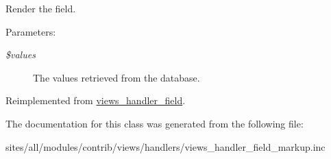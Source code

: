Render the field.

\begin{Desc}
\item[Parameters:]
\begin{description}
\item[{\em \$values}]The values retrieved from the database. \end{description}
\end{Desc}


Reimplemented from \hyperlink{classviews__handler__field_82ff951c5e9ceb97b2eab86f880cbc1e}{views\_\-handler\_\-field}.

The documentation for this class was generated from the following file:\begin{CompactItemize}
\item 
sites/all/modules/contrib/views/handlers/views\_\-handler\_\-field\_\-markup.inc\end{CompactItemize}

